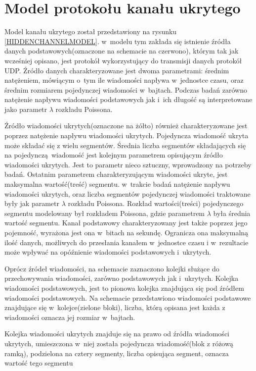 \documentclass[a4paper, twoside, 12pt]{report}
\begin{document}
    \section{Model protokołu kanału ukrytego}

    Model kanału ukrytego został przedstawiony na rysunku \ref{HIDDENCHANNELMODEL}. w~modelu tym zakłada się
    istnienie źródła danych podstawowych(oznaczone na schemacie na czerwono),
    którym tak jak wcześniej opisano, jest
    protokół wykorzystujący do transmisji danych protokół UDP. Źródło danych
    charakteryzowane jest dwoma parametrami: średnim natężeniem, mówiącym
    o~tym ile wiadomości napływa w~jednostce czasu, oraz średnim rozmiarem
    pojedynczej wiadomości w~bajtach. Podczas badań zarówno natężenie napływu wiadomości
    podstawowych jak i~ich długość są interpretowane jako parametr \(\lambda \) rozkładu
    Poissona.

    Źródło wiadomości ukrytych(oznaczone na żółto) również charakteryzowane jest poprzez natężenie
    napływu wiadomości ukrytych. Pojedyncza wiadomość ukryta może składać się z wielu
    segmentów. Średnia liczba segmentów składających się na pojedynczą wiadomość
    jest kolejnym parametrem opisującym źródło wiadomości ukrytych. Jest to parametr
    nieco sztuczny, wprowadzony na potrzeby badań. Ostatnim parametrem charakteryzującym
    wiadomości ukryte, jest maksymalna wartość(treść) segmentu. w~trakcie badań
    natężenie napływu wiadomości ukrytych, oraz liczba segmentów pojedynczej wiadomości
    traktowane były jak parametr \(\lambda \) rozkładu Poissona. Rozkład wartości(treści)
    pojedynczego segmentu modelowany był rozkładem Poissona, gdzie parametrem \(\lambda\) była
    średnia wartość segmentu. Kanał podstawowy charakteryzowany jest także
    poprzez jego pojemność, wyrażona jest ona w~bitach na sekundę. Ogranicza ona
    maksymalną ilość danych, możliwych do przesłania kanałem w~jednostce czasu i
    w~rezultacie może wpływać na opóźnienie wiadomości podstawowych i~ukrytych.

    Oprócz źródeł wiadomości, na schemacie zaznaczono kolejki służące do przechowywania
    wiadomości, zarówno podstawowych jak i~ukrytych. Kolejka wiadomości podstawowych,
    jest to pionowa kolejka znajdująca się pod źródłem wiadomości podstawowych.
    Na schemacie przedstawiono wiadomości podstawowe znajdujące się w~kolejce(zielone bloki),
    liczba, którą opisana jest każda z wiadomości oznacza jej rozmiar w~bajtach.

    Kolejka wiadomości ukrytych znajduje się na prawo od źródła wiadomości ukrytych,
    umieszczona w~niej została pojedyncza wiadomość(blok z różową ramką), podzielona
    na cztery segmenty, liczba opisująca segment, oznacza wartość tego segmentu
\end{document}
